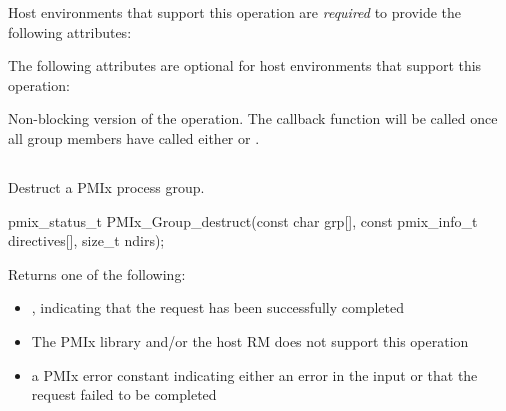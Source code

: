 Host environments that support this operation are \textit{required} to provide the following attributes:


\reqattrend

\optattrstart
The following attributes are optional for host environments that support this operation:


\optattrend

\descr

Non-blocking version of the  operation. The callback function will be called once all group members have called either  or .

\subsection{}

\summary

Destruct a \ac{PMIx} process group.

\format

\cspecificstart
\begin{codepar}
pmix_status_t
PMIx_Group_destruct(const char grp[],
                    const pmix_info_t directives[],
                    size_t ndirs);
\end{codepar}
\cspecificend

\begin{arglist}
\end{arglist}

Returns one of the following:

\begin{itemize}
    \item {}, indicating that the request has been successfully completed
    \item {} The \ac{PMIx} library and/or the host \ac{RM} does not support this operation
    \item a \ac{PMIx} error constant indicating either an error in the input or that the request failed to be completed
\end{itemize}

